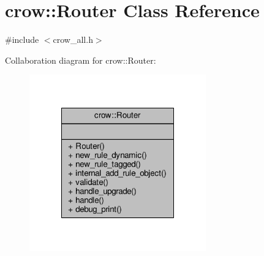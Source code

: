 \hypertarget{classcrow_1_1_router}{\section{crow\-:\-:Router Class Reference}
\label{classcrow_1_1_router}
}


{\ttfamily \#include $<$crow\-\_\-all.\-h$>$}



Collaboration diagram for crow\-:\-:Router\-:
\nopagebreak
\begin{figure}[H]
\begin{center}
\leavevmode
\includegraphics[width=216pt]{classcrow_1_1_router__coll__graph}
\end{center}
\end{figure}
